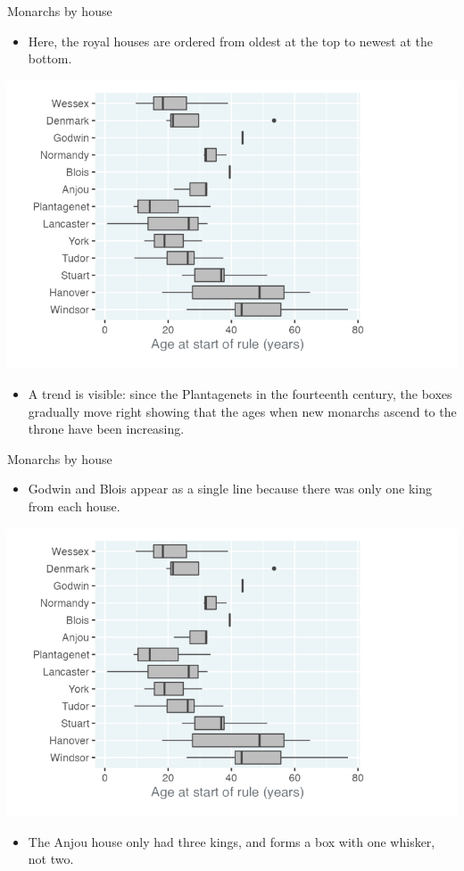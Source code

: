 \documentclass[
  ignorenonframetext,
]{beamer}
\providecommand{\tightlist}{%
  \setlength{\itemsep}{0pt}\setlength{\parskip}{0pt}}
\begin{document}
\begin{frame}{Monarchs by house}
\label{monarchs-by-house-1}
\begin{itemize}
\tightlist
\item
  Here, the royal houses are ordered from oldest at the top to newest at
  the bottom.
\end{itemize}

\includegraphics{../images/im28.png}

\begin{itemize}
\tightlist
\item
  A trend is visible: since the Plantagenets in the fourteenth century,
  the boxes gradually move right showing that the ages when new monarchs
  ascend to the throne have been increasing.
\end{itemize}
\end{frame}

\begin{frame}{Monarchs by house}
\label{monarchs-by-house-2}
\begin{itemize}
\tightlist
\item
  Godwin and Blois appear as a single line because there was only one
  king from each house.
\end{itemize}

\includegraphics{../images/im28.png}

\begin{itemize}
\tightlist
\item
  The Anjou house only had three kings, and forms a box with one
  whisker, not two.
\end{itemize}
\end{frame}
\end{document}
